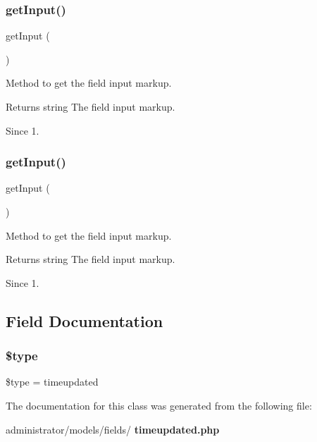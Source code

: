 \subsubsection{get\+Input()\hspace{0.1cm}{\footnotesize\ttfamily [1/2]}}
{\footnotesize\ttfamily get\+Input (\begin{DoxyParamCaption}{ }\end{DoxyParamCaption})\hspace{0.3cm}{\ttfamily [protected]}}

Method to get the field input markup.

\begin{DoxyReturn}{Returns}
string The field input markup.
\end{DoxyReturn}
\begin{DoxySince}{Since}
1. 
\end{DoxySince}
\mbox{\label{class_j_form_field_timeupdated_a4380f30ae9202fa49ebd2439572f9cdb}} 
\subsubsection{get\+Input()\hspace{0.1cm}{\footnotesize\ttfamily [2/2]}}
{\footnotesize\ttfamily get\+Input (\begin{DoxyParamCaption}{ }\end{DoxyParamCaption})\hspace{0.3cm}{\ttfamily [protected]}}

Method to get the field input markup.

\begin{DoxyReturn}{Returns}
string The field input markup.
\end{DoxyReturn}
\begin{DoxySince}{Since}
1. 
\end{DoxySince}


\subsection{Field Documentation}
\mbox{\label{class_j_form_field_timeupdated_a9a4a6fba2208984cabb3afacadf33919}} 
\subsubsection{\$type}
{\footnotesize\ttfamily \$type = \textquotesingle{}timeupdated\textquotesingle{}\hspace{0.3cm}{\ttfamily [protected]}}



The documentation for this class was generated from the following file\+:\begin{DoxyCompactItemize}
\item 
administrator/models/fields/\textbf{ timeupdated.\+php}\end{DoxyCompactItemize}
